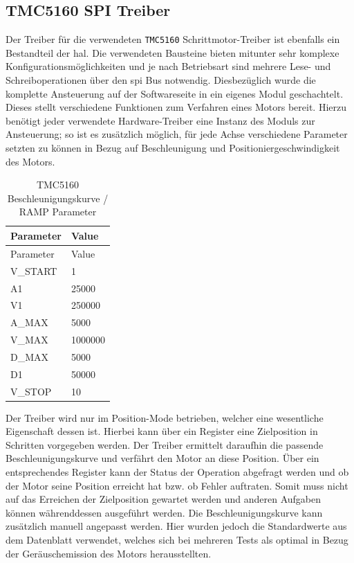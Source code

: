 \hypertarget{tmc5160-spi-treiber}{%
\subsection{TMC5160 SPI Treiber}\label{tmc5160-spi-treiber}}

Der Treiber für die verwendeten \passthrough{\lstinline!TMC5160!}
Schrittmotor-Treiber ist ebenfalls ein Bestandteil der \gls{hal}. Die
verwendeten Bausteine bieten mitunter sehr komplexe
Konfigurationsmöglichkeiten und je nach Betriebsart sind mehrere Lese-
und Schreiboperationen über den \gls{spi} Bus notwendig. Diesbezüglich
wurde die komplette Ansteuerung auf der Softwareseite in ein eigenes
Modul geschachtelt. Dieses stellt verschiedene Funktionen zum Verfahren
eines Motors bereit. Hierzu benötigt jeder verwendete Hardware-Treiber
eine Instanz des Moduls zur Ansteuerung; so ist es zusätzlich möglich,
für jede Achse verschiedene Parameter setzten zu können in Bezug auf
Beschleunigung und Positioniergeschwindigkeit des Motors.

\begin{longtable}[]{@{}ll@{}}
\caption{TMC5160 Beschleunigungskurve / RAMP Parameter}\tabularnewline
\toprule
Parameter & Value\tabularnewline
\midrule
\endfirsthead
\toprule
Parameter & Value\tabularnewline
\midrule
\endhead
V\_START & 1\tabularnewline
A1 & 25000\tabularnewline
V1 & 250000\tabularnewline
A\_MAX & 5000\tabularnewline
V\_MAX & 1000000\tabularnewline
D\_MAX & 5000\tabularnewline
D1 & 50000\tabularnewline
V\_STOP & 10\tabularnewline
\bottomrule
\end{longtable}

Der Treiber wird nur im Position-Mode betrieben, welcher eine
wesentliche Eigenschaft dessen ist. Hierbei kann über ein Register eine
Zielposition in Schritten vorgegeben werden. Der Treiber ermittelt
daraufhin die passende Beschleunigungskurve und verfährt den Motor an
diese Position. Über ein entsprechendes Register kann der Status der
Operation abgefragt werden und ob der Motor seine Position erreicht hat
bzw. ob Fehler auftraten. Somit muss nicht auf das Erreichen der
Zielposition gewartet werden und anderen Aufgaben können währenddessen
ausgeführt werden. Die Beschleunigungskurve kann zusätzlich manuell
angepasst werden. Hier wurden jedoch die Standardwerte aus dem
Datenblatt verwendet, welches sich bei mehreren Tests als optimal in
Bezug der Geräuschemission des Motors herausstellten.

